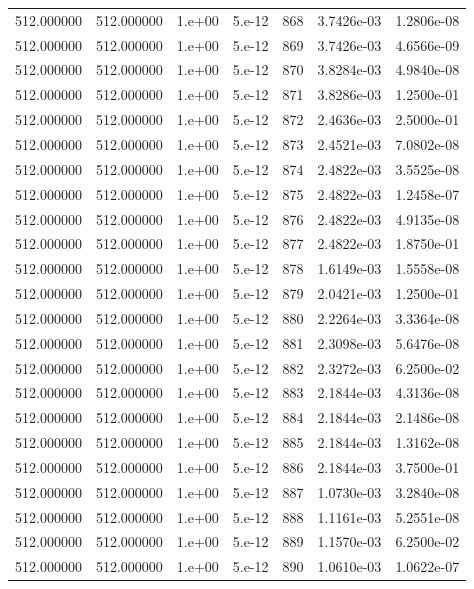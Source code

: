 \begin{table}[htbp]
\begin{tabular}{rrrrrrr}
512.000000 & 512.000000 & 1.e+00 & 5.e-12 & 868 & 3.7426e-03 & 1.2806e-08 \\
512.000000 & 512.000000 & 1.e+00 & 5.e-12 & 869 & 3.7426e-03 & 4.6566e-09 \\
512.000000 & 512.000000 & 1.e+00 & 5.e-12 & 870 & 3.8284e-03 & 4.9840e-08 \\
512.000000 & 512.000000 & 1.e+00 & 5.e-12 & 871 & 3.8286e-03 & 1.2500e-01 \\
512.000000 & 512.000000 & 1.e+00 & 5.e-12 & 872 & 2.4636e-03 & 2.5000e-01 \\
512.000000 & 512.000000 & 1.e+00 & 5.e-12 & 873 & 2.4521e-03 & 7.0802e-08 \\
512.000000 & 512.000000 & 1.e+00 & 5.e-12 & 874 & 2.4822e-03 & 3.5525e-08 \\
512.000000 & 512.000000 & 1.e+00 & 5.e-12 & 875 & 2.4822e-03 & 1.2458e-07 \\
512.000000 & 512.000000 & 1.e+00 & 5.e-12 & 876 & 2.4822e-03 & 4.9135e-08 \\
512.000000 & 512.000000 & 1.e+00 & 5.e-12 & 877 & 2.4822e-03 & 1.8750e-01 \\
512.000000 & 512.000000 & 1.e+00 & 5.e-12 & 878 & 1.6149e-03 & 1.5558e-08 \\
512.000000 & 512.000000 & 1.e+00 & 5.e-12 & 879 & 2.0421e-03 & 1.2500e-01 \\
512.000000 & 512.000000 & 1.e+00 & 5.e-12 & 880 & 2.2264e-03 & 3.3364e-08 \\
512.000000 & 512.000000 & 1.e+00 & 5.e-12 & 881 & 2.3098e-03 & 5.6476e-08 \\
512.000000 & 512.000000 & 1.e+00 & 5.e-12 & 882 & 2.3272e-03 & 6.2500e-02 \\
512.000000 & 512.000000 & 1.e+00 & 5.e-12 & 883 & 2.1844e-03 & 4.3136e-08 \\
512.000000 & 512.000000 & 1.e+00 & 5.e-12 & 884 & 2.1844e-03 & 2.1486e-08 \\
512.000000 & 512.000000 & 1.e+00 & 5.e-12 & 885 & 2.1844e-03 & 1.3162e-08 \\
512.000000 & 512.000000 & 1.e+00 & 5.e-12 & 886 & 2.1844e-03 & 3.7500e-01 \\
512.000000 & 512.000000 & 1.e+00 & 5.e-12 & 887 & 1.0730e-03 & 3.2840e-08 \\
512.000000 & 512.000000 & 1.e+00 & 5.e-12 & 888 & 1.1161e-03 & 5.2551e-08 \\
512.000000 & 512.000000 & 1.e+00 & 5.e-12 & 889 & 1.1570e-03 & 6.2500e-02 \\
512.000000 & 512.000000 & 1.e+00 & 5.e-12 & 890 & 1.0610e-03 & 1.0622e-07 \\

\end{tabular}
\end{table}
